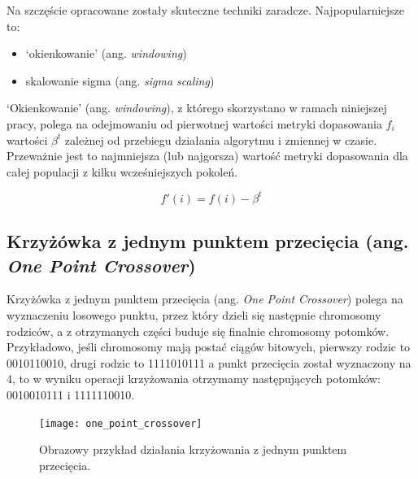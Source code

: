 \documentclass[a4paper,12pt]{article}
\numberwithin{figure}{section}
\begin{document}
    \bigskip

    \noindent
    \begin{minipage}[H]{\textwidth}
        \setlength\parindent{17pt} Na szczęście opracowane zostały skuteczne techniki zaradcze. Najpopularniejsze to:
        \begin{itemize}
            \item `okienkowanie' (ang. \textit{windowing})
            \item skalowanie sigma (ang. \textit{sigma scaling})
        \end{itemize}
    \end{minipage}

    \bigskip

    `Okienkowanie' (ang. \textit{windowing}), z którego skorzystano w ramach niniejszej pracy, polega na odejmowaniu od pierwotnej wartości metryki dopasowania  $f_{i}$ wartości $\beta^{t}$ zależnej od przebiegu działania algorytmu i zmiennej w czasie. Przeważnie jest to najmniejsza (lub najgorsza) wartość metryki dopasowania dla całej populacji z kilku wcześniejszych pokoleń\cite{IntroductionToEvolutionaryComputing2015}.

    \bigskip

    \begin{equation}
        \label{eq:new_fitness}
        f'(i) = f(i) - \beta^{t}
    \end{equation}

    \subsection{Krzyżówka z jednym punktem przecięcia (ang. \textit{One Point Crossover})}

    Krzyżówka z jednym punktem przecięcia (ang. \textit{One Point Crossover}) polega na wyznaczeniu losowego punktu, przez który dzieli się następnie chromosomy rodziców, a z otrzymanych części buduje się finalnie chromosomy potomków. Przykładowo, jeśli chromosomy mają postać ciągów bitowych, pierwszy rodzic to 0010110010, drugi rodzic to 1111010111 a punkt przecięcia został wyznaczony na 4, to w wyniku operacji krzyżowania otrzymamy następujących potomków: 0010010111 i 1111110010\cite{GeneticAlgorithmEssentials2017}.

    \bigskip

    \begin{figure}[H]
        \centering
        \texttt{[image: one\_point\_crossover]}
        \caption{Obrazowy przykład działania krzyżowania z jednym punktem przecięcia.}
        \label{fig:one_point_crossover}
    \end{figure}
\end{document}
